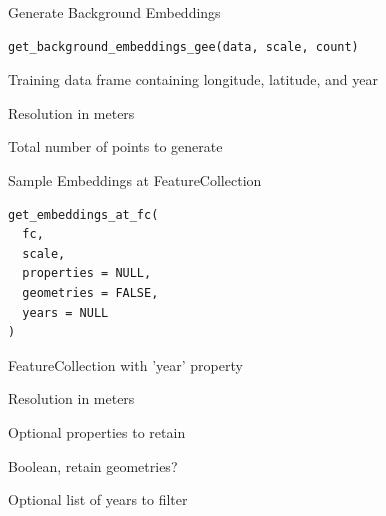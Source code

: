\documentclass[letterpaper]{book}
\begin{document}
%
\begin{Description}
Generate Background Embeddings
\end{Description}
%
\begin{Usage}
\begin{verbatim}
get_background_embeddings_gee(data, scale, count)
\end{verbatim}
\end{Usage}
%
\begin{Arguments}
\begin{ldescription}
\item[\code{data}] Training data frame containing longitude, latitude, and year

\item[\code{scale}] Resolution in meters

\item[\code{count}] Total number of points to generate
\end{ldescription}
\end{Arguments}
%
\begin{Description}
Sample Embeddings at FeatureCollection
\end{Description}
%
\begin{Usage}
\begin{verbatim}
get_embeddings_at_fc(
  fc,
  scale,
  properties = NULL,
  geometries = FALSE,
  years = NULL
)
\end{verbatim}
\end{Usage}
%
\begin{Arguments}
\begin{ldescription}
\item[\code{fc}] FeatureCollection with 'year' property

\item[\code{scale}] Resolution in meters

\item[\code{properties}] Optional properties to retain

\item[\code{geometries}] Boolean, retain geometries?

\item[\code{years}] Optional list of years to filter
\end{ldescription}
\end{Arguments}
\end{document}
